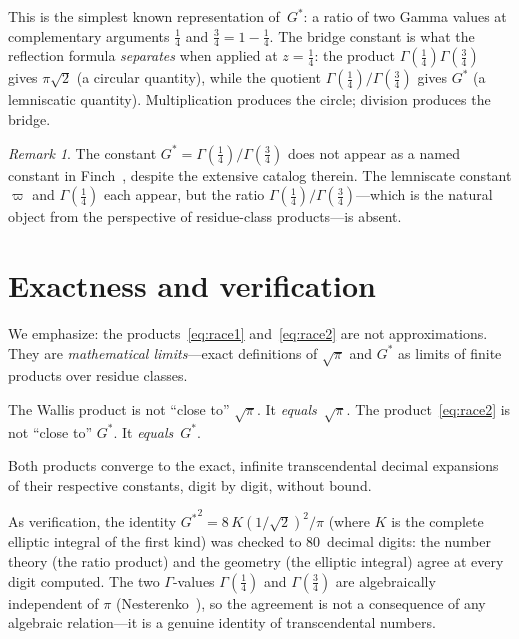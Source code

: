 \documentclass[12pt,reqno]{amsart}
\theoremstyle{definition}
\theoremstyle{remark}
\newtheorem{remark}[theorem]{Remark}
\newcommand{\Gstar}{G^{\!*}}
\newcommand{\varpiup}{\varpi}
\begin{document}
This is the simplest known representation of~$\Gstar$: a ratio of two
Gamma values at complementary arguments $\tfrac14$ and $\tfrac34 =
1-\tfrac14$.  The bridge constant is what the reflection formula
\emph{separates} when applied at $z=\tfrac14$: the product
$\Gamma(\tfrac14)\Gamma(\tfrac34)$ gives $\pi\sqrt{2}$ (a circular
quantity), while the quotient $\Gamma(\tfrac14)/\Gamma(\tfrac34)$ gives
$\Gstar$ (a lemniscatic quantity).  Multiplication produces the circle;
division produces the bridge.

\begin{remark}\label{rem:finch}
The constant $\Gstar = \Gamma(\tfrac14)/\Gamma(\tfrac34)$ does not
appear as a named constant in Finch~\cite{Finch}, despite the extensive
catalog therein.  The lemniscate constant $\varpiup$ and
$\Gamma(\tfrac14)$ each appear, but the ratio
$\Gamma(\tfrac14)/\Gamma(\tfrac34)$---which is the natural object from
the perspective of residue-class products---is absent.
\end{remark}


\section{Exactness and verification}

We emphasize: the products~\eqref{eq:race1} and~\eqref{eq:race2} are
not approximations.  They are \emph{mathematical limits}---exact
definitions of $\sqrt{\pi}$ and $\Gstar$ as limits of finite products
over residue classes.

The Wallis product is not ``close to'' $\sqrt{\pi}$.  It
\emph{equals}~$\sqrt{\pi}$.  The product~\eqref{eq:race2} is not
``close to'' $\Gstar$.  It \emph{equals}~$\Gstar$.

Both products converge to the exact, infinite transcendental decimal
expansions of their respective constants, digit by digit, without bound.

As verification, the identity ${\Gstar}^{2} = 8\,K(1/\!\sqrt{2})^{2}/\pi$
(where $K$ is the complete elliptic integral of the first kind) was
checked to $80$~decimal digits: the number theory (the ratio product)
and the geometry (the elliptic integral) agree at every digit computed.
The two $\Gamma$-values $\Gamma(\tfrac14)$ and $\Gamma(\tfrac34)$ are
algebraically independent of $\pi$ (Nesterenko~\cite{Nesterenko}), so
the agreement is not a consequence of any algebraic relation---it is a
genuine identity of transcendental numbers.
\end{document}
